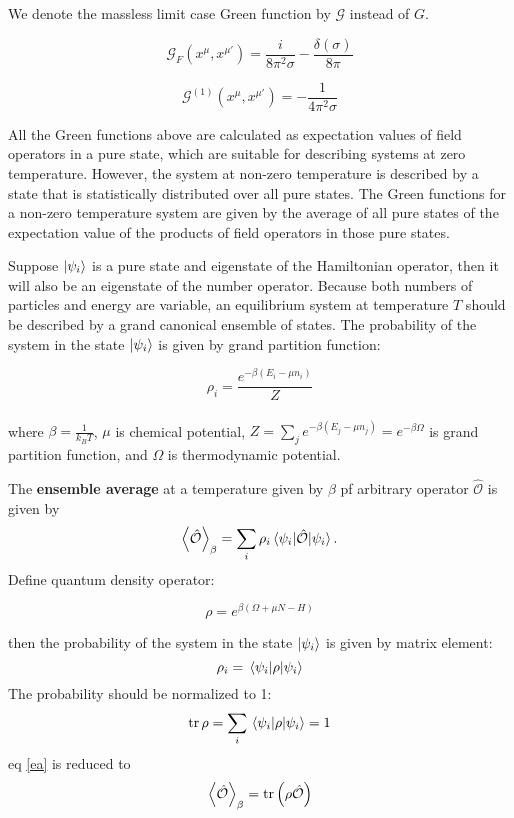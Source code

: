 \documentclass[12pt]{article}
\numberwithin{equation}{subsection}
\theoremstyle{mystyle}{\newtheorem{definition}{Definition}[subsection]}
\theoremstyle{mystyle}{\newtheorem{theorem}[definition]{Theorem}}
\theoremstyle{mystyle}{\newtheorem*{remark}{Remark}}
\theoremstyle{mystyle}{\newtheorem{example}{Example}[subsection]}
\theoremstyle{mystyle}{\newtheorem{examples}{Examples}[subsection]}
\theoremstyle{mystyle}{\newtheorem{cthm}{}[subsection]}
\newcommand{\tbf}[1]{\textbf{#1}}
\begin{document}
We denote the massless limit case Green function by \(\mathcal{G}\) instead of \(G\).

\begin{example}
  \[\mathcal{G}_F(x^{\mu},x^{\mu'})=\frac{i}{8\pi^2\sigma}-\frac{\delta(\sigma)}{8\pi}\]
\end{example}
\begin{example}
  \[\mathcal{G}^{(1)}(x^{\mu},x^{\mu'})=-\frac{1}{4\pi^2\sigma}\]
\end{example}

All the Green functions above are calculated as expectation values of field operators in a pure state,
which are suitable for describing systems at zero temperature.
However, the system at non-zero temperature is described by a state that is statistically distributed over all pure states.
The Green functions for a non-zero temperature system are given by the average of
all pure states of the expectation value of the products of field operators in those pure states.

Suppose \(\ket{\psi_i}\) is a pure state and eigenstate of the Hamiltonian operator, then it will also be an eigenstate of the number operator.
Because both numbers of particles and energy are variable, an equilibrium system at temperature \(T\) should be described by a grand canonical ensemble of states.
The probability of the system in the state \(\ket{\psi_i}\) is given by grand partition function:
\begin{cthm}
  \[\rho_i=\frac{e^{-\beta (E_i-\mu n_i)}}{Z}\]
  \\
  where \(\beta=\frac{1}{k_BT}\), \(\mu\) is chemical potential, \(Z=\sum_je^{-\beta(E_j-\mu n_j)}=e^{-\beta\Omega}\) is grand partition function,
  and \(\Omega\) is thermodynamic potential.
\end{cthm}
The \tbf{ensemble average} at a temperature given by \(\beta\) pf arbitrary operator \(\mathcal{\hat{O}}\) is given by
\begin{equation}\label{ea}
  \expval{\mathcal{\hat{O}}}_{\beta}=\sum_i\rho_i\expval{\mathcal{\hat{O}}}{\psi_i}.
\end{equation}
Define quantum density operator:
\begin{definition}
  \[\rho=e^{\beta(\Omega+\mu N-H)}\]
\end{definition}
then the probability of the system in the state \(\ket{\psi_i}\) is given by matrix element:
\begin{equation}
  \rho_i=\expval{\rho}{\psi_i}
\end{equation}
The probability should be normalized to 1:
\begin{equation}
  \tr\rho=\sum_i \expval{\rho}{\psi_i}=1
\end{equation}
eq \ref{ea} is reduced to
\begin{equation}
  \expval{\mathcal{\hat{O}}}_\beta=\tr \left(\rho\mathcal{\hat{O}}\right)
\end{equation}
\end{document}
